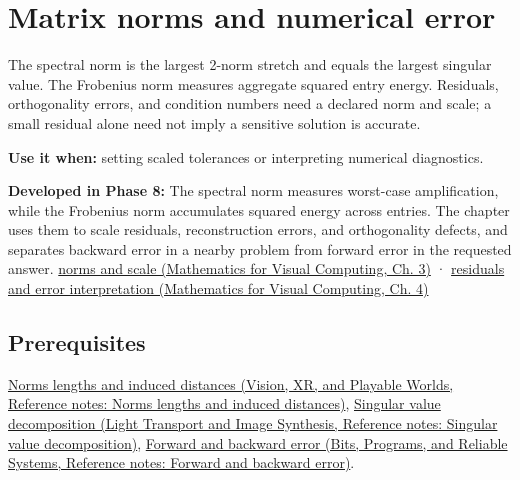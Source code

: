 \hypertarget{appendix-f8657bac66e5}{}\label{referencestart:appendix-f8657bac66e5}
\section{Matrix norms and numerical error}\label{appendix-f8657bac66e5-matrix-norms-and-numerical-error}

\hypertarget{appendix-f8657bac66e5-matrix-norms-and-numerical-error}{}

The spectral norm is the largest 2-norm stretch and equals the largest singular value. The Frobenius norm measures aggregate squared entry energy. Residuals, orthogonality errors, and condition numbers need a declared norm and scale; a small residual alone need not imply a sensitive solution is accurate.

\textbf{Use it when:} setting scaled tolerances or interpreting numerical diagnostics.

\textbf{Developed in Phase 8:} The spectral norm measures worst-case amplification, while the Frobenius norm accumulates squared energy across entries. The chapter uses them to scale residuals, reconstruction errors, and orthogonality defects, and separates backward error in a nearby problem from forward error in the requested answer. \href{../02-Mathematics-for-Visual-Computing/main.pdf\#nameddest=01-foundations-i-ch019-matrix-norms-put-scale-into-error-statements}{norms and scale (Mathematics for Visual Computing, Ch. 3)} · \href{../02-Mathematics-for-Visual-Computing/main.pdf\#nameddest=01-foundations-i-ch020-residuals-distinguish-backward-accuracy-from-forward-certainty}{residuals and error interpretation (Mathematics for Visual Computing, Ch. 4)}

\subsection{Prerequisites}\label{appendix-f8657bac66e5-prerequisites}

\hypertarget{appendix-f8657bac66e5-prerequisites}{}

\href{../07-Vision-XR-and-Playable-Worlds/main.pdf\#nameddest=appendix-49933872bb51}{Norms lengths and induced distances (Vision, XR, and Playable Worlds, Reference notes: Norms lengths and induced distances)}, \href{../04-Light-Transport-and-Image-Synthesis/main.pdf\#nameddest=appendix-1fad5e7f36fa}{Singular value decomposition (Light Transport and Image Synthesis, Reference notes: Singular value decomposition)}, \href{../01-Bits-Programs-and-Reliable-Systems/main.pdf\#nameddest=appendix-a7fbaf6d1b1c}{Forward and backward error (Bits, Programs, and Reliable Systems, Reference notes: Forward and backward error)}.

